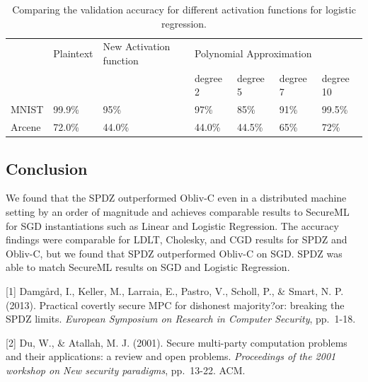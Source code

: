 \documentclass{article}
\begin{document}
\begin{table}[h!] 
\caption{Comparing the validation accuracy for different activation functions for logistic regression.}
\centering
\label{my-label}
\begin{tabular}{@{}lllllll@{}}
\toprule
       & Plaintext & New Activation function & \multicolumn{4}{l}{Polynomial Approximation} \\
       &           &                         & degree 2  & degree 5  & degree 7 & degree 10 \\ \midrule
MNIST  & 99.9\%    & 95\%                    & 97\%      & 85\%      & 91\%     & 99.5\%    \\
Arcene & 72.0\%    &           44.0\%              &   44.0\%        &    44.5\%       &    65\%      &    72\%       \\ \bottomrule
\end{tabular}
\vspace{-4mm}
\label{tbl1}
\end{table}

\subsection{Conclusion}

We found that the SPDZ outperformed Obliv-C even in a distributed machine setting by an order of magnitude and achieves comparable results to SecureML for SGD instantiations such as Linear and Logistic Regression. The accuracy findings were comparable for LDLT, Cholesky, and CGD results for SPDZ and Obliv-C, but we found that SPDZ outperformed Obliv-C on SGD. SPDZ was able to match SecureML results on SGD and Logistic Regression.





\iffalse

\small

[1] Damg\aa rd, I., Keller, M., Larraia, E., Pastro, V., Scholl, P., \& Smart, N. P. (2013). Practical covertly secure MPC for dishonest majority?or: breaking the SPDZ limits. {\it European Symposium on Research in Computer Security}, pp.\ 1-18.

[2] Du, W., \& Atallah, M. J. (2001). Secure multi-party computation problems and their applications: a review and open problems. {\it Proceedings of the 2001 workshop on New security paradigms}, pp.\ 13-22. ACM.
\end{document}
